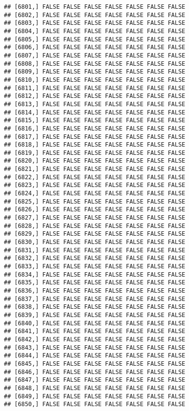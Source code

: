 \documentclass[
]{article}
\begin{document}
\begin{verbatim}
## [6801,] FALSE FALSE FALSE FALSE FALSE FALSE FALSE
## [6802,] FALSE FALSE FALSE FALSE FALSE FALSE FALSE
## [6803,] FALSE FALSE FALSE FALSE FALSE FALSE FALSE
## [6804,] FALSE FALSE FALSE FALSE FALSE FALSE FALSE
## [6805,] FALSE FALSE FALSE FALSE FALSE FALSE FALSE
## [6806,] FALSE FALSE FALSE FALSE FALSE FALSE FALSE
## [6807,] FALSE FALSE FALSE FALSE FALSE FALSE FALSE
## [6808,] FALSE FALSE FALSE FALSE FALSE FALSE FALSE
## [6809,] FALSE FALSE FALSE FALSE FALSE FALSE FALSE
## [6810,] FALSE FALSE FALSE FALSE FALSE FALSE FALSE
## [6811,] FALSE FALSE FALSE FALSE FALSE FALSE FALSE
## [6812,] FALSE FALSE FALSE FALSE FALSE FALSE FALSE
## [6813,] FALSE FALSE FALSE FALSE FALSE FALSE FALSE
## [6814,] FALSE FALSE FALSE FALSE FALSE FALSE FALSE
## [6815,] FALSE FALSE FALSE FALSE FALSE FALSE FALSE
## [6816,] FALSE FALSE FALSE FALSE FALSE FALSE FALSE
## [6817,] FALSE FALSE FALSE FALSE FALSE FALSE FALSE
## [6818,] FALSE FALSE FALSE FALSE FALSE FALSE FALSE
## [6819,] FALSE FALSE FALSE FALSE FALSE FALSE FALSE
## [6820,] FALSE FALSE FALSE FALSE FALSE FALSE FALSE
## [6821,] FALSE FALSE FALSE FALSE FALSE FALSE FALSE
## [6822,] FALSE FALSE FALSE FALSE FALSE FALSE FALSE
## [6823,] FALSE FALSE FALSE FALSE FALSE FALSE FALSE
## [6824,] FALSE FALSE FALSE FALSE FALSE FALSE FALSE
## [6825,] FALSE FALSE FALSE FALSE FALSE FALSE FALSE
## [6826,] FALSE FALSE FALSE FALSE FALSE FALSE FALSE
## [6827,] FALSE FALSE FALSE FALSE FALSE FALSE FALSE
## [6828,] FALSE FALSE FALSE FALSE FALSE FALSE FALSE
## [6829,] FALSE FALSE FALSE FALSE FALSE FALSE FALSE
## [6830,] FALSE FALSE FALSE FALSE FALSE FALSE FALSE
## [6831,] FALSE FALSE FALSE FALSE FALSE FALSE FALSE
## [6832,] FALSE FALSE FALSE FALSE FALSE FALSE FALSE
## [6833,] FALSE FALSE FALSE FALSE FALSE FALSE FALSE
## [6834,] FALSE FALSE FALSE FALSE FALSE FALSE FALSE
## [6835,] FALSE FALSE FALSE FALSE FALSE FALSE FALSE
## [6836,] FALSE FALSE FALSE FALSE FALSE FALSE FALSE
## [6837,] FALSE FALSE FALSE FALSE FALSE FALSE FALSE
## [6838,] FALSE FALSE FALSE FALSE FALSE FALSE FALSE
## [6839,] FALSE FALSE FALSE FALSE FALSE FALSE FALSE
## [6840,] FALSE FALSE FALSE FALSE FALSE FALSE FALSE
## [6841,] FALSE FALSE FALSE FALSE FALSE FALSE FALSE
## [6842,] FALSE FALSE FALSE FALSE FALSE FALSE FALSE
## [6843,] FALSE FALSE FALSE FALSE FALSE FALSE FALSE
## [6844,] FALSE FALSE FALSE FALSE FALSE FALSE FALSE
## [6845,] FALSE FALSE FALSE FALSE FALSE FALSE FALSE
## [6846,] FALSE FALSE FALSE FALSE FALSE FALSE FALSE
## [6847,] FALSE FALSE FALSE FALSE FALSE FALSE FALSE
## [6848,] FALSE FALSE FALSE FALSE FALSE FALSE FALSE
## [6849,] FALSE FALSE FALSE FALSE FALSE FALSE FALSE
## [6850,] FALSE FALSE FALSE FALSE FALSE FALSE FALSE

\end{verbatim}
\end{document}
